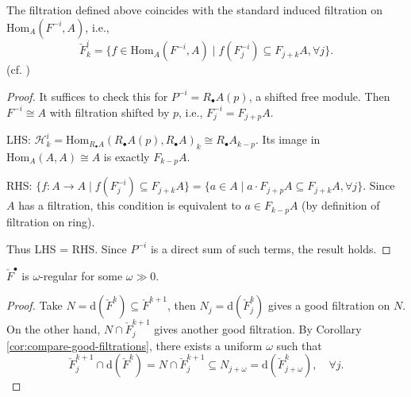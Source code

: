 \begin{proposition}\label{prop:filtration-on-Hom}
    The filtration defined above coincides with the standard induced filtration on $\mathrm{Hom}_A(F^{-i}, A)$, i.e.,
    $$ \check{F}^i_k = \{ f \in \mathrm{Hom}_A(F^{-i}, A) \mid f(F_j^{-i}) \subseteq F_{j+k}A, \forall j \}. $$
    (cf. \cite[Appendix~D, after Lemma~D.2.2]{hotta2008d})
\end{proposition}
\begin{proof}
    It suffices to check this for $P^{-i} = R_{\bullet}A(p)$, a shifted free module.
    Then $F^{-i} \cong A$ with filtration shifted by $p$, i.e., $F_j^{-i} = F_{j+p}A$.

    LHS: $\mathcal{H}^i_k = \mathrm{Hom}_{R_{\bullet}A}(R_{\bullet}A(p), R_{\bullet}A)_k \cong R_{\bullet}A_{k-p}$.
    Its image in $\mathrm{Hom}_A(A, A) \cong A$ is exactly $F_{k-p}A$.

    RHS: $\{ f: A \to A \mid f(F_j^{-i}) \subseteq F_{j+k}A \} = \{ a \in A \mid a \cdot F_{j+p}A \subseteq F_{j+k}A, \forall j \}$.
    Since $A$ has a filtration, this condition is equivalent to $a \in F_{k-p}A$ (by definition of filtration on ring).

    Thus LHS = RHS. Since $P^{-i}$ is a direct sum of such terms, the result holds.
\end{proof}

\begin{lemma}\label{lem:checkF-regular}
    $\check{F}^{\bullet}$ is  $\omega$-regular for some $\omega \gg 0.$
\end{lemma}
\begin{proof}
    Take $N = \mathrm{d}(\check{F}^{k}) \subseteq \check{F}^{k+1}$, then $N_j = \mathrm{d}(\check{F}_{j}^{k})$ gives a good filtration on $N$.
    On the other hand, $N \cap \check{F}_{j}^{k+1}$ gives another good filtration. By Corollary \ref{cor:compare-good-filtrations}, there exists a uniform $\omega$ such that $$ \check{F}_{j}^{k+1} \cap \mathrm{d}(\check{F}^{k}) = N \cap \check{F}_{j}^{k+1} \subseteq N_{j+\omega} = \mathrm{d}(\check{F}_{j+\omega}^{k}), \quad \forall j. $$
\end{proof}

